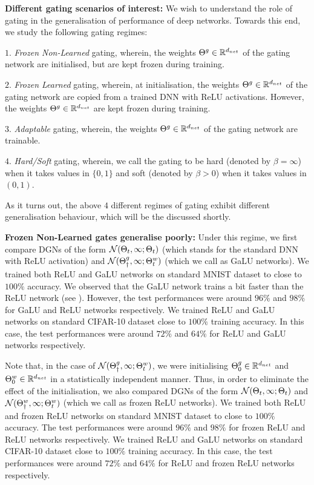 \textbf{Different gating scenarios of interest:}  We wish to understand the role of gating in the generalisation of performance of deep networks. Towards this end, we study the following gating regimes:

$1$. \emph{Frozen Non-Learned} gating, wherein, the weights ${\Theta}^g\in\mathbb{R}^{d_{net}}$ of the gating network are initialised, but are kept frozen during training. 

$2$. \emph{Frozen Learned} gating, wherein, at initialisation, the weights ${\Theta}^g\in\mathbb{R}^{d_{net}}$ of the gating network are copied from a trained DNN with ReLU activations. However, the weights ${\Theta}^g\in\mathbb{R}^{d_{net}}$ are kept frozen during training. 

$3.$ \emph{Adaptable} gating, wherein, the weights ${\Theta}^g\in\mathbb{R}^{d_{net}}$ of the gating network are trainable.

$4.$ \emph{Hard/Soft} gating, wherein, we call the gating to be hard (denoted by $\beta=\infty$) when it takes values in $\{0,1\}$  and soft (denoted by $\beta>0$) when it takes values in $(0,1)$. 

As it turns out, the above $4$ different regimes of gating exhibit different generalisation behaviour, which will be the discussed shortly.


\textbf{Frozen Non-Learned gates generalise poorly:} Under this regime, we first compare DGNs of the form $\mathcal{N}(\Theta_t,\infty;\Theta_t)$ (which stands for the standard DNN with ReLU activation) and $\mathcal{N}({\Theta}^g_{\dagger},\infty;{\Theta}^w_t)$ (which we call as GaLU networks). We trained both ReLU and GaLU networks on standard MNIST dataset to close to $100\%$ accuracy. We observed that the GaLU network trains a bit faster than the ReLU network (see  ). However, the test performances were around $96\%$ and  $98\%$ for GaLU and ReLU networks respectively. We trained ReLU and GaLU networks on standard CIFAR-10 dataset close to $100\%$ training accuracy. In this case, the test performances were around $72\%$ and $64\%$ for ReLU and GaLU networks respectively.

Note that, in the case of $\mathcal{N}({\Theta}^g_{\dagger},\infty;{\Theta}^w_t)$, we were initialising ${\Theta}^g_0\in \mathbb{R}^{d_{net}}$ and ${\Theta}^w_0\in \mathbb{R}^{d_{net}}$ in a statistically independent manner. Thus, in order to eliminate the effect of the initialisation, we also compared DGNs of the form  $\mathcal{N}(\Theta_t,\infty;\Theta_t)$ and $\mathcal{N}({\Theta}^w_{\dagger},\infty;{\Theta}^w_t)$ (which we call as frozen ReLU networks). We trained both ReLU and frozen ReLU networks on standard MNIST dataset to close to $100\%$ accuracy. The test performances were around $96\%$ and  $98\%$ for frozen ReLU and ReLU networks respectively. We trained ReLU and GaLU networks on standard CIFAR-10 dataset close to $100\%$ training accuracy. In this case, the test performances were around $72\%$ and $64\%$ for ReLU and frozen ReLU networks respectively.



